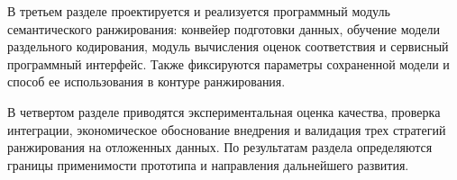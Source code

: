 В третьем разделе проектируется и реализуется программный модуль семантического ранжирования: конвейер подготовки данных, обучение модели раздельного кодирования, модуль вычисления оценок соответствия и сервисный программный интерфейс. Также фиксируются параметры сохраненной модели и способ ее использования в контуре ранжирования.\par
В четвертом разделе приводятся экспериментальная оценка качества, проверка интеграции, экономическое обоснование внедрения и валидация трех стратегий ранжирования на отложенных данных. По результатам раздела определяются границы применимости прототипа и направления дальнейшего развития.\par
